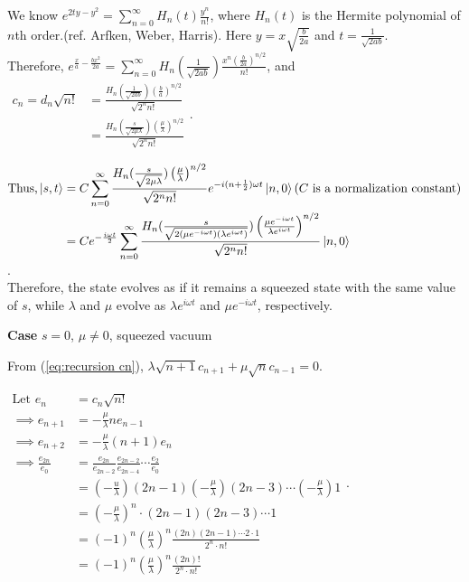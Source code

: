 \documentclass[12pt, twoside]{article}
\begin{document}
We know $e^{2ty -y^2} = \sum _ { n = 0 } ^ { \infty } H _ { n } ( t ) \frac { y ^ { n } } { n ! }$, where $H_n(t)$ is the Hermite polynomial of $n$th order.(ref. Arfken, Weber, Harris). Here $y = x \sqrt{\frac{b}{2a}}$ and $t = \frac{1}{\sqrt{2ab}}$. \\ Therefore, $e^{\frac{x}{a} - \frac{bx^2}{2a}} = \sum _ { n = 0 } ^ { \infty } H _ { n }( \frac{1}{\sqrt { 2 a b } }) \frac {x ^ { n } \left( \frac { b } { 2 a } \right) ^ { n / 2 } } { n ! }$, and \\$\begin{aligned}c_n = d_n \sqrt{n!} &= \frac{ H_n ( \frac { 1 } { \sqrt { 2 a b } }) \left( \frac { b } { a } \right) ^ { n / 2 }}{\sqrt{2^n n!}}\\ &=\frac{ H_n ( \frac { s } { \sqrt { 2 \mu \lambda } }) \left( \frac { \mu } { \lambda } \right) ^ { n / 2 }}{\sqrt{2^n n!}}\end{aligned}$.

$\begin{aligned}\text{Thus,}\ket{s,t} &= C \sum _ { n = 0 } ^ { \infty } \frac{ H_n ( \frac { s } { \sqrt { 2 \mu \lambda } }) \left( \frac { \mu } { \lambda } \right) ^ { n / 2 }}{\sqrt{2^n n!}} e^{-i(n+\frac{1}{2})\omega t}\ket{n,0} (C \text{ is a normalization constant}) \\ &= C e^{-\frac{i\omega t}{2}}\sum _ { n = 0 } ^ { \infty } \frac{ H_n ( \frac { s } { \sqrt { 2 (\mu e^{-i\omega t}) (\lambda e^{i\omega t}) } }) \left( \frac { \mu e^{-i\omega t}} { \lambda e^{i\omega t} } \right) ^ { n / 2 }}{\sqrt{2^n n!}}\ket{n,0} \end{aligned}$.\\ Therefore, the state evolves as if it remains a squeezed state with the same value of $s$, while $\lambda$ and $\mu$ evolve as $ \lambda e^{i\omega t}$ and $\mu e^{-i\omega t}$, respectively.

\textbf{Case} $s = 0$, $\mu \neq 0$, squeezed vacuum

From (\ref{eq:recursion cn}), $\lambda \sqrt{n+1}c_{n+1} + \mu \sqrt{n} c_{n-1} = 0$. 

$\begin{aligned}\text{Let } e_n &= c_n \sqrt{n!} \\\implies e_{n+1} &= -\frac{\mu}{\lambda} n e_{n-1} \\\implies e_{n+2} &= -\frac{\mu}{\lambda} (n+1) e_n \\ \implies \frac { e_{2n} } { e _ { 0 } } &= \frac { e_{2n} } { e_{2n- 2} } \frac { e_{2n- 2} } { e_{2n- 4} } \cdots \frac { e _ { 2 } } { e _ { 0 } } \\ &= \left( - \frac { u } { \lambda } \right) { ( 2n - 1 ) } \left( - \frac { \mu } { \lambda } \right) ( 2n - 3 ) \cdots \left( - \frac { \mu } { \lambda } \right) 1 \\
  &= \left( -\frac { \mu } { \lambda } \right) ^ { n } \cdot ( 2 n - 1 ) ( 2 n - 3 ) \cdots 1 \\  &= ( - 1 ) ^ { n } \left( \frac { \mu } { \lambda } \right) ^ { n } \frac { ( 2 n ) ( 2 n - 1 ) \cdots 2\cdot1 } {2 ^ { n } \cdot n !  } \\ &= ( - 1 ) ^ { n } \left( \frac { \mu } { \lambda } \right) ^ { n } \frac { (2n)! } {2 ^ { n } \cdot n !  }  \end{aligned}$.
  
\end{document}
